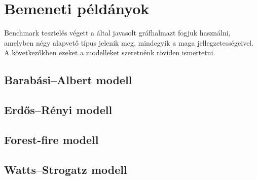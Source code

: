 \section{Bemeneti példányok}\label{sec:BENCHMARK-PROBLEM-INSTANCES}
Benchmark tesztelés végett a  által javasolt gráfhalmazt fogjuk használni, amelyben négy alapvető típus jelenik meg, mindegyik a maga jellegzetességeivel.
A következőkben ezeket a modelleket szeretnénk röviden ismertetni.


\subsection{Barabási–Albert modell}



\subsection{Erdős–Rényi modell}



\subsection{Forest-fire modell}



\subsection{Watts–Strogatz modell}



